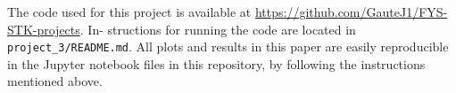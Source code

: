 The code used for this project is available at
\url{https://github.com/GauteJ1/FYS-STK-projects}. In-
structions for running the code are located in
\texttt{project\_3/README.md}. All plots and results in this paper
are easily reproducible in the Jupyter notebook files in
this repository, by following the instructions mentioned
above.